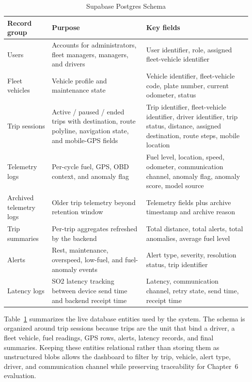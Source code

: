 \begin{table}[!htbp]
\centering
\caption{Supabase Postgres Schema}
\label{tab:supabase_postgres_schema}
\scriptsize
\begin{tabular}{|p{}|p{}|p{}|}
\hline
\textbf{Record group} & \textbf{Purpose} & \textbf{Key fields} \\
\hline
Users & Accounts for administrators, fleet managers, managers, and drivers & User identifier, role, assigned fleet-vehicle identifier \\
\hline
Fleet vehicles & Vehicle profile and maintenance state & Vehicle identifier, fleet-vehicle code, plate number, current odometer, status \\
\hline
Trip sessions & Active / paused / ended trips with destination, route polyline, navigation state, and mobile-GPS fields & Trip identifier, fleet-vehicle identifier, driver identifier, trip status, distance, assigned destination, route steps, mobile location \\
\hline
Telemetry logs & Per-cycle fuel, GPS, OBD context, and anomaly flag & Fuel level, location, speed, odometer, communication channel, anomaly flag, anomaly score, model source \\
\hline
Archived telemetry logs & Older trip telemetry beyond retention window & Telemetry fields plus archive timestamp and archive reason \\
\hline
Trip summaries & Per-trip aggregates refreshed by the backend & Total distance, total alerts, total anomalies, average fuel level \\
\hline
Alerts & Rest, maintenance, overspeed, low-fuel, and fuel-anomaly events & Alert type, severity, resolution status, trip identifier \\
\hline
Latency logs & SO2 latency tracking between device send time and backend receipt time & Latency, communication channel, retry state, send time, receipt time \\
\hline
\end{tabular}
\normalsize
\end{table}

Table~\ref{tab:supabase_postgres_schema} summarizes the live database entities used by the system. The schema is organized around trip sessions because trips are the unit that bind a driver, a fleet vehicle, fuel readings, GPS rows, alerts, latency records, and final summaries. Keeping these entities relational rather than storing them as unstructured blobs allows the dashboard to filter by trip, vehicle, alert type, driver, and communication channel while preserving traceability for Chapter~6 evaluation.

